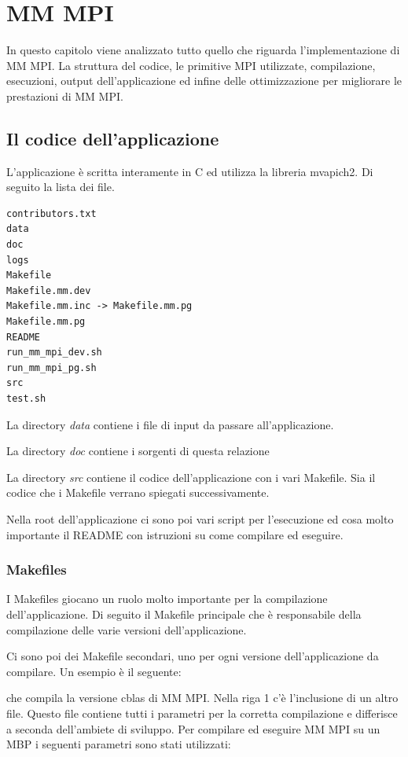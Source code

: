 \chapter{MM MPI}
In questo capitolo viene analizzato tutto quello che riguarda l'implementazione di MM MPI. La struttura del codice, le primitive MPI utilizzate, compilazione, esecuzioni, output dell'applicazione ed infine delle ottimizzazione per migliorare le prestazioni di MM MPI.

\section{Il codice dell'applicazione}
L'applicazione \`{e} scritta interamente in C ed utilizza la libreria mvapich2. Di seguito la lista dei file.

\begin{lstlisting}
contributors.txt
data
doc
logs
Makefile
Makefile.mm.dev
Makefile.mm.inc -> Makefile.mm.pg
Makefile.mm.pg
README
run_mm_mpi_dev.sh
run_mm_mpi_pg.sh
src
test.sh
\end{lstlisting}

La directory \textit{data} contiene i file di input da passare all'applicazione.

La directory \textit{doc} contiene i sorgenti di questa relazione

La directory \textit{src} contiene il codice dell'applicazione con i vari Makefile. Sia il codice che i Makefile verrano spiegati successivamente.

Nella root dell'applicazione ci sono poi vari script per l'esecuzione ed cosa molto importante il README con istruzioni su come compilare ed eseguire.

\subsection{Makefiles}
I Makefiles giocano un ruolo molto importante per la compilazione dell'applicazione. Di seguito il Makefile principale che \`{e} responsabile della compilazione delle varie versioni dell'applicazione.



Ci sono poi dei Makefile secondari, uno per ogni versione dell'applicazione da compilare. Un esempio \`{e} il seguente:



che compila la versione cblas di MM MPI. Nella riga 1 c'\`{e} l'inclusione di un altro file. Questo file contiene tutti i parametri per la corretta compilazione e differisce a seconda dell'ambiete di sviluppo. Per compilare ed eseguire MM MPI su un MBP i seguenti parametri sono stati utilizzati:


